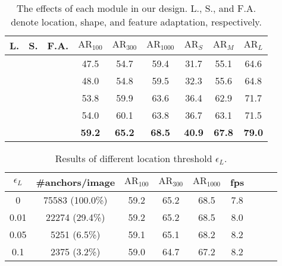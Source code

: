 \documentclass[10pt,twocolumn,letterpaper]{article}
\begin{document}
\begin{table}[t]
	\centering
	\caption{\small{The effects of each module in our design. L., S., and F.A. denote location, shape, and feature adaptation, respectively.}}
		\addtolength{\tabcolsep}{-2pt}
	\small{
		\begin{tabular}{*{9}{c}}
			\toprule
			L.   & S.      & F.A. & $\text{AR}_{100}$ & $\text{AR}_{300}$ & $\text{AR}_{1000}$ & $\text{AR}_{S}$ & $\text{AR}_{M}$ & $\text{AR}_{L}$ \\
			\midrule
			           &            &                  & 47.5              & 54.7              & 59.4               & 31.7            & 55.1            & 64.6            \\
			\checkmark &            &                  & 48.0              & 54.8              & 59.5               & 32.3            & 55.6            & 64.8            \\
			           & \checkmark &                  & 53.8              & 59.9              & 63.6               & 36.4            & 62.9            & 71.7            \\
			\checkmark & \checkmark &                  & 54.0              & 60.1              & 63.8               & 36.7            & 63.1            & 71.5            \\
			\checkmark & \checkmark & \checkmark       & \textbf{59.2}     & \textbf{65.2}     & \textbf{68.5}      & \textbf{40.9}   & \textbf{67.8}   & \textbf{79.0}   \\
			\bottomrule
		\end{tabular}
	}
	\vspace{-5pt}
	\label{tab:components}
\end{table}


\begin{table}[t]
	\centering
	\caption{\small{Results of different location threshold $\epsilon_L$.}}
	\addtolength{\tabcolsep}{-2pt}
	\small{
		\begin{tabular}{*{9}{c}}
			\toprule
			$\epsilon_L$ & \#anchors/image & $\text{AR}_{100}$ & $\text{AR}_{300}$ & $\text{AR}_{1000}$ & fps \\
			\midrule
			0         & 75583 (100.0\%) & 59.2              & 65.2              & 68.5               & 7.8 \\
			0.01      & 22274 (29.4\%)  & 59.2              & 65.2              & 68.5               & 8.0 \\
			0.05      & 5251 (6.5\%)    & 59.1              & 65.1              & 68.2               & 8.2 \\
			0.1       & 2375 (3.2\%)    & 59.0              & 64.7              & 67.2               & 8.2 \\
			\bottomrule
		\end{tabular}
	}
	\vspace{-5pt}
	\label{tab:location-thr}
\end{table}
\end{document}
